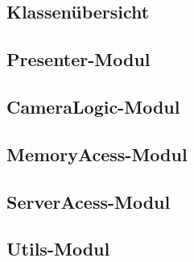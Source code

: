 \subsection{Klassenübersicht}

\subsection{Presenter-Modul}


\subsection{CameraLogic-Modul}

\subsection{MemoryAcess-Modul}

\subsection{ServerAcess-Modul}

\subsection{Utils-Modul}